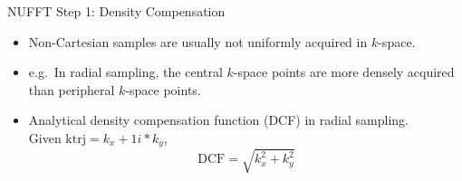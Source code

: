 \begin{frame}[fragile]{NUFFT Step 1: Density Compensation}

    \begin{itemize}
        \item Non-Cartesian samples are usually not uniformly acquired in $k$-space.
        \item e.g.~In radial sampling, the central $k$-space points are more densely acquired than peripheral $k$-space points.
        \item Analytical density compensation function (DCF) in radial sampling. \\
        \vspace{1em}
        Given $\mathrm{ktrj} = k_x + 1i * k_y$, \\
        \begin{equation}
        	\mathrm{DCF} = \sqrt{k_x^2 + k_y^2}
        \end{equation}
    \end{itemize}

\end{frame}


